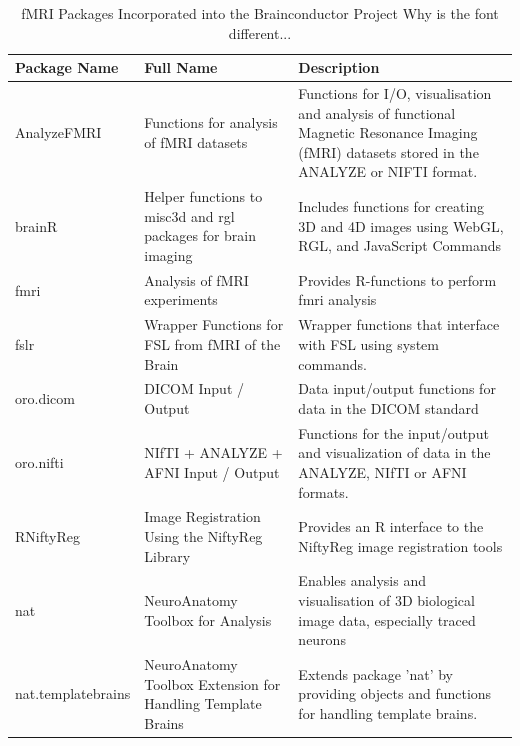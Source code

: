 \documentclass{nature}
\begin{document}
\begin{table}
\begin{footnotesize}
\begin{center}
    \begin{tabular}{ | l | p{4cm} |  p{6cm} |}
    \hline
	Package Name & Full Name & Description \\ \hline
	AnalyzeFMRI & Functions for analysis of fMRI datasets %
	&
	Functions for I/O, visualisation and analysis of functional Magnetic Resonance
Imaging (fMRI) datasets stored in the ANALYZE or NIFTI format.
	\\\hline
	brainR & Helper functions to misc3d and rgl packages for brain imaging &
	Includes functions for creating 3D and 4D images using WebGL, RGL, and
JavaScript Commands \\\hline
	fmri & Analysis of fMRI experiments &
	Provides R-functions to perform fmri analysis \\\hline
	fslr & Wrapper Functions for FSL  from fMRI of the Brain &
	Wrapper functions that interface with FSL using system commands. \\\hline
	oro.dicom & DICOM Input / Output &
	Data input/output functions for data in the DICOM standard \\\hline
	oro.nifti & NIfTI + ANALYZE + AFNI Input / Output &
	Functions for the input/output and visualization of data in the ANALYZE, NIfTI
or AFNI formats. \\\hline
	RNiftyReg & Image Registration Using the NiftyReg Library &
	Provides an R interface to the NiftyReg image registration tools \\\hline
	nat & NeuroAnatomy Toolbox for Analysis &
	Enables analysis and visualisation of 3D biological image data, especially
traced neurons \\\hline
	nat.templatebrains & NeuroAnatomy Toolbox Extension for Handling Template
Brains &
	Extends package 'nat'  by providing objects and functions for handling template
brains. \\
	\hline
    \end{tabular}
    \caption{fMRI Packages Incorporated into the Brainconductor Project
{\color{red}Why is the font different...}}
    \label{tab:neuro}
\end{center}
\end{footnotesize}
\end{table}
\end{document}
